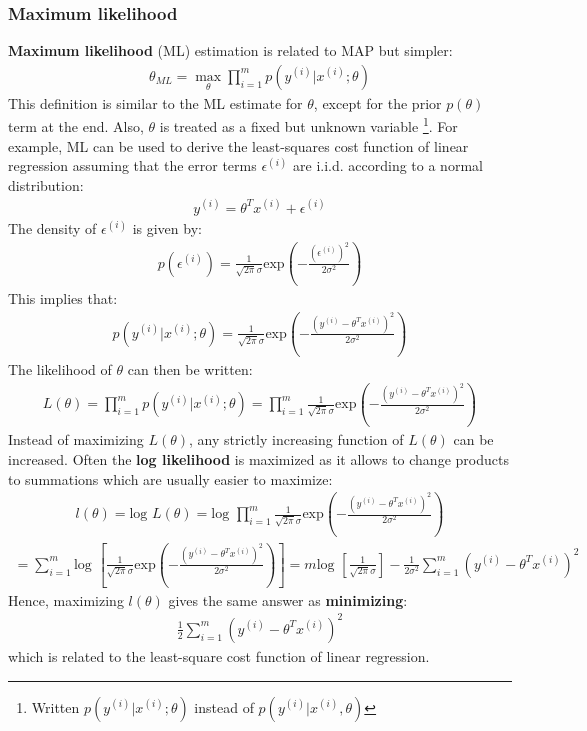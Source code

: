 \documentclass{report}
\begin{document}
\subsubsection{Maximum likelihood}
{\bf Maximum likelihood} (ML) estimation is related to MAP but simpler:
\begin{align*}
\theta_{ML}=\max\limits_{\theta} \prod_{i=1}^m p(y^{(i)}\vert x^{(i)};\theta)
\end{align*}
This definition is similar to the ML estimate for $\theta$, except for the prior $p(\theta)$ term at the end. 
Also, $\theta$ is treated as a fixed but unknown variable \footnote{Written $ p(y^{(i)}\vert x^{(i)};\theta)$ instead of $ p(y^{(i)}\vert x^{(i)},\theta)$}. For example, ML can be used to derive the least-squares cost function of linear regression assuming that the error terms $\epsilon^{(i)}$ are i.i.d. according to a normal distribution:
\begin{align*}
y^{(i)}=\theta^Tx^{(i)}+\epsilon^{(i)}
\end{align*}
The density of $\epsilon^{(i)}$ is given by:
\begin{align*}
p(\epsilon^{(i)})=\frac{1}{\sqrt{2\pi}\sigma}\mbox{exp}(-\frac{(\epsilon^{(i)})^2}{2\sigma^2})
\end{align*}
This implies that:
\begin{align*}
p(y^{(i)}\vert x^{(i)};\theta)=\frac{1}{\sqrt{2\pi}\sigma}\mbox{exp}(-\frac{(y^{(i)}-\theta^Tx^{(i)})^2}{2\sigma^2})
\end{align*}
The likelihood of $\theta$ can then be written:
\begin{align*}
L(\theta)=\prod_{i=1}^m p(y^{(i)}\vert x^{(i)};\theta)=\prod_{i=1}^m\frac{1}{\sqrt{2\pi}\sigma}\mbox{exp}(-\frac{(y^{(i)}-\theta^Tx^{(i)})^2}{2\sigma^2})
\end{align*}
Instead of maximizing $L(\theta)$, any strictly increasing function of $L(\theta)$ can be increased. Often the {\bf log likelihood} is maximized as it allows to change products to summations which are usually easier to maximize:
\begin{align*}
l(\theta)=\mbox{log } L(\theta)=\mbox{log }\prod_{i=1}^m\frac{1}{\sqrt{2\pi}\sigma}\mbox{exp}(-\frac{(y^{(i)}-\theta^Tx^{(i)})^2}{2\sigma^2})
\end{align*}
\begin{align*}
=\sum_{i=1}^m \mbox{log }[\frac{1}{\sqrt{2\pi}\sigma}\mbox{exp}(-\frac{(y^{(i)}-\theta^Tx^{(i)})^2}{2\sigma^2})]
=m\mbox{log }[\frac{1}{\sqrt{2\pi}\sigma}] -\frac{1}{2\sigma^2}\sum_{i=1}^{m}(y^{(i)}-\theta^Tx^{(i)})^2
\end{align*}
Hence, maximizing $l(\theta)$ gives the same answer as {\bf minimizing}:
\begin{align*}
\frac{1}{2}\sum_{i=1}^{m}(y^{(i)}-\theta^Tx^{(i)})^2
\end{align*}
which is related to the least-square cost function of linear regression.
\end{document}
